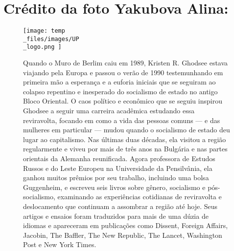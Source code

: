 \chapter{Crédito da foto Yakubova Alina:}\label{Crédito da foto Yakubova Alina:}
 \par 
\begin{figure}
	\centering
	\texttt{[image: temp\\\_files/images/UP\\\_logo.png ]}
	\caption{Quando o Muro de Berlim caiu em 1989, Kristen R. Ghodsee estava viajando pela Europa e passou o verão de 1990 testemunhando em primeira mão a esperança e a euforia iniciais que se seguiram ao colapso repentino e inesperado do socialismo de estado no antigo Bloco Oriental. O caos político e econômico que se seguiu inspirou Ghodsee a seguir uma carreira acadêmica estudando essa reviravolta, focando em como a vida das pessoas comuns — e das mulheres em particular — mudou quando o socialismo de estado deu lugar ao capitalismo. Nas últimas duas décadas, ela visitou a região regularmente e viveu por mais de três anos na Bulgária e nas partes orientais da Alemanha reunificada. Agora professora de Estudos Russos e do Leste Europeu na Universidade da Pensilvânia, ela ganhou muitos prêmios por seu trabalho, incluindo uma bolsa Guggenheim, e escreveu seis livros sobre gênero, socialismo e pós-socialismo, examinando as experiências cotidianas de reviravolta e deslocamento que continuam a assombrar a região até hoje. Seus artigos e ensaios foram traduzidos para mais de uma dúzia de idiomas e apareceram em publicações como Dissent, Foreign Affairs, Jacobin, The Baffler, The New Republic, The Lancet, Washington Post e New York Times.}
	\label{ }
\end{figure}
